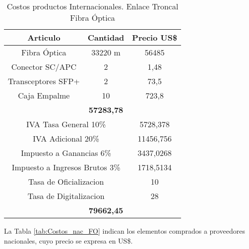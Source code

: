 \begin{table}[H]
  \centering
    \begin{tabular}{|c|c|c|}
    \hline
    \rowcolor[rgb]{ .773,  .851,  .945} \textbf{Articulo} & \textbf{Cantidad} & \textbf{Precio US\$} \bigstrut\\
    \hline
    \multicolumn{1}{|p{11.22em}|}{Fibra Óptica} & \multicolumn{1}{p{7.055em}|}{33220 m} & 56485 \bigstrut\\
    \hline
    \multicolumn{1}{|p{11.22em}|}{Conector SC/APC} & 2     & 1,48 \bigstrut\\
    \hline
    \multicolumn{1}{|p{11.22em}|}{Transceptores SFP+} & 2     & 73,5 \bigstrut\\
    \hline
    \multicolumn{1}{|p{11.22em}|}{Caja Empalme} & 10    & 723,8 \bigstrut\\
    \hline
    \rowcolor[rgb]{ .773,  .851,  .945} \multicolumn{2}{|c|}{\textbf{Costo}} & \textbf{57283,78} \bigstrut\\
    \hline
    \multicolumn{2}{|p{18.275em}|}{IVA Tasa General 10\%} & 5728,378 \bigstrut\\
    \hline
    \multicolumn{2}{|p{18.275em}|}{IVA Adicional 20\%} & 11456,756 \bigstrut\\
    \hline
    \multicolumn{2}{|p{18.275em}|}{Impuesto a Ganancias 6\%} & 3437,0268 \bigstrut\\
    \hline
    \multicolumn{2}{|p{18.275em}|}{Impuesto a Ingresos Brutos 3\%} & 1718,5134 \bigstrut\\
    \hline
    \multicolumn{2}{|p{18.275em}|}{Tasa de Oficializacion} & 10 \bigstrut\\
    \hline
    \multicolumn{2}{|p{18.275em}|}{Tasa de Digitalizacion} & 28 \bigstrut\\
    \hline
    \rowcolor[rgb]{ .773,  .851,  .945} \multicolumn{2}{|c|}{\textbf{Total}} & \textbf{79662,45} \bigstrut\\
    \hline
    \end{tabular}%
    \caption{Costos productos Internacionales. Enlace Troncal Fibra Óptica}
  \label{tab:Costos_int_FO}%
\end{table}%



La Tabla \ref{tab:Costos_nac_FO} indican los elementos comprados a proveedores nacionales, cuyo precio se expresa en US\$. 



